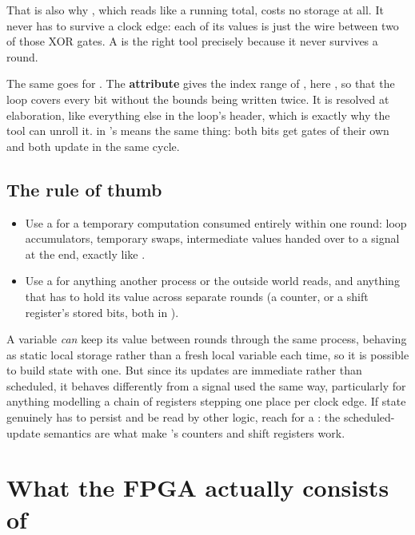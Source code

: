 That is also why , which reads like a running total, costs no storage at all. It never
has to survive a clock edge: each of its values is just the wire between two of those XOR gates. A
 is the right tool precisely because it never survives a round.

The same goes for . The \textbf{attribute}  gives the index range of
, here , so that the loop covers every bit without the bounds being
written twice. It is resolved at elaboration, like everything else in the loop's header, which is
exactly why the tool can unroll it.  in 's
 means the same thing: both bits get gates of their own and both update in the
same cycle.

\subsection*{The rule of thumb}
\begin{itemize}
  \item Use a  for a temporary computation consumed entirely within one round: loop
    accumulators, temporary swaps, intermediate values handed over to a signal at the end, exactly
    like .
  \item Use a  for anything another process or the outside world reads, and anything
    that has to hold its value across separate rounds (a counter, or a shift register's stored
    bits, both in ).
\end{itemize}

A variable \emph{can} keep its value between rounds through the same process, behaving as static
local storage rather than a fresh local variable each time, so it is possible to build state with
one. But since its updates are immediate rather than scheduled, it behaves differently from a signal
used the same way, particularly for anything modelling a chain of registers stepping one place per
clock edge. If state genuinely has to persist and be read by other logic, reach for a
: the scheduled-update semantics are what make 's counters and shift
registers work.

\section{What the FPGA actually consists of}
\label{c5:sec:fabric}

